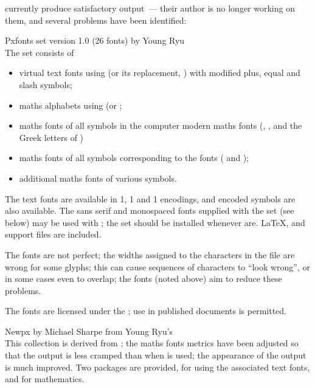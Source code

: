 currently produce satisfactory output~--- their author is no longer
working on them, and several problems have been identified:
\begin{booklist}
\item[Pxfonts set version 1.0](26 fonts) by Young Ryu\\
  The  set consists of
  \begin{itemize}
  \item virtual text fonts using  
    (or its  replacement, )
    with modified plus, equal and slash symbols;
  \item maths alphabets using  (or ;
  \item maths fonts of all symbols in the computer modern maths fonts
    (, ,  and the Greek
    letters of ) 
  \item maths fonts of all symbols corresponding to the 
    fonts ( and );
  \item additional maths fonts of various symbols.
  \end{itemize}
  The text fonts are available in 1, 1 and 1
  encodings, and  encoded symbols are also available.  The
  sans serif and monospaced fonts supplied with the 
  set (see below) may be used with ; the
   set should be installed whenever 
  are.  \LaTeX{},  and \PDFTeX{} support files are
  included.

  The fonts are not perfect; the widths assigned to the characters in
  the  file are wrong for some glyphs; this can cause
  sequences of characters to ``look wrong'', or in some cases even to
  overlap; the  fonts (noted above) aim to reduce
  these problems.

  The fonts are licensed under the ; use in published
  documents is permitted.

\item[Newpx]by Michael Sharpe from Young Ryu's \\
  This collection is derived from ; the maths fonts
  metrics have been adjusted so that the output is less cramped than
  when  is used; the appearance of the output is
  much improved.  Two packages are provided,  for
  using the associated text fonts, and  for
  mathematics.


\end{booklist}
